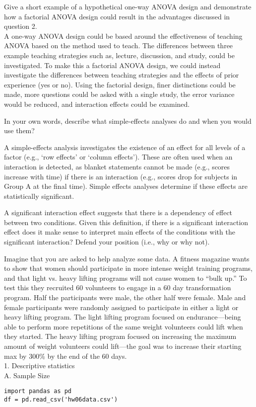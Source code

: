 \documentclass[onecolumn,10pt]{jhwhw}
\begin{document}
\problem{}
Give a short example of a hypothetical one-way ANOVA design and demonstrate how a factorial ANOVA design could result in the advantages discussed in question 2.\\

A one-way ANOVA design could be based around the effectiveness of teaching ANOVA based on the method used to teach. The differences between three example teaching strategies such as, lecture, discussion, and study, could be investigated. To make this a factorial ANOVA design, we could instead investigate the differences between teaching strategies and the effects of prior experience (yes or no). Using the factorial design, finer distinctions could be made, more questions could be asked with a single study, the error variance would be reduced, and interaction effects could be examined.

\problem{}
In your own words, describe what simple-effects analyses do and when you would use them?

A simple-effects analysis investigates the existence of an effect for all levels of a factor (e.g., `row effects' or `column effects'). These are often used when an interaction is detected, as blanket statements cannot be made (e.g., scores increase with time) if there is an interaction (e.g., scores drop for subjects in Group A at the final time). Simple effects analyses determine if these effects are statistically significant.

\problem{}
A significant interaction effect suggests that there is a dependency of effect between two conditions. Given this definition, if there is a significant interaction effect does it make sense to interpret main effects of the conditions with the significant interaction? Defend your position (i.e., why or why not).

\clearpage
\problem{}
Imagine that you are asked to help analyze some data. A fitness magazine wants to show that women should participate in more intense weight training programs, and that light vs. heavy lifting programs will not cause women to ``bulk up.'' To test this they recruited 60 volunteers to engage in a 60 day transformation program. Half the participants were male, the other half were female. Male and female participants were randomly assigned to participate in either a light or heavy lifting program. The light lifting program focused on endurance---being able to perform more repetitions of the same weight volunteers could lift when they started. The heavy lifting program focused on increasing the maximum amount of weight volunteers could lift---the goal was to increase their starting max by 300\% by the end of the 60 days.
\vspace{1em}\\
1. Descriptive statistics\\
A. Sample Size
\begin{lstlisting}
import pandas as pd
df = pd.read_csv('hw06data.csv')
\end{lstlisting}
\end{document}
